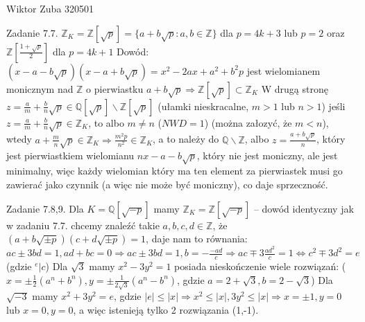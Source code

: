 \documentclass{article}
\begin{document}
Wiktor Zuba 320501
\newline

Zadanie 7.7.
\newline
\newline
$\mathbb{Z}_{K}=\mathbb{Z}[\sqrt{p}]=\{a+b\sqrt{p}:a,b\in\mathbb{Z}\}$ dla $p=4k+3$ lub $p=2$ oraz $\mathbb{Z}[\frac{1+\sqrt{p}}{2}]$ dla $p=4k+1$\newline
Dowód:$(x-a-b\sqrt{p})(x-a+b\sqrt{p})=x^2-2ax+a^2+b^2p$ jest wielomianem monicznym nad $\mathbb{Z}$ o pierwiastku $a+b\sqrt{p}\Rightarrow\mathbb{Z}[\sqrt{p}]\subset\mathbb{Z}_{K}$\newline
W drugą stronę $z=\frac{a}{m}+\frac{b}{n}\sqrt{p}\in\mathbb{Q}[\sqrt{p}]\backslash\mathbb{Z}[\sqrt{p}]$ (ułamki nieskracalne, $m>1$ lub $n>1$)
jeśli $z=\frac{a}{m}+\frac{b}{n}\sqrt{p}\in\mathbb{Z}_{K}$, to albo $m\neq n$ ($NWD=1$) (można załozyć, że $m<n$), wtedy $a+\frac{m}{n}\sqrt{p}\in\mathbb{Z}_{K}\Rightarrow\frac{m^2p}{n^2}\in\mathbb{Z}_{K}$,
a to należy do $\mathbb{Q}\backslash\mathbb{Z}$, albo $z=\frac{a+b\sqrt{p}}{n}$, który jest pierwiastkiem wielomianu $nx-a-b\sqrt{p}$, który nie jest moniczny, ale jest minimalny,
więc każdy wielomian który ma ten element za pierwiastek musi go zawierać jako czynnik (a więc nie może być moniczny), co daje sprzeczność.
\newline

Zadanie 7.8,9.
\newline
\newline
Dla $K=\mathbb{Q}[\sqrt{-p}]$ mamy $\mathbb{Z}_{K}=\mathbb{Z}[\sqrt{-p}]$ -- dowód identyczny jak w zadaniu 7.7.\newline
chcemy znaleźć takie $a,b,c,d\in\mathbb{Z}$, że $(a+b\sqrt{\pm p})(c+d\sqrt{\pm p})=1$, daje nam to równania:\newline
$ac\pm3bd=1,ad+bc=0\Rightarrow ac\pm3bd=1, b=-\frac{-ad}{c}\Rightarrow ac\mp 3\frac{ad^2}{c}=1\Leftrightarrow c^2\mp3d^2=e$ (gdzie $^e|c$)\newline
Dla $\sqrt{3}$ mamy $x^2-3y^2=1$ posiada nieskończenie wiele rozwiązań:\newline
($x=\pm\frac{1}{2}(a^n+b^n), y=\pm\frac{1}{2\sqrt{3}}(a^n-b^n)$, gdzie $a=2+\sqrt{3},b=2-\sqrt{3}$)\newline
Dla $\sqrt{-3}$ mamy $x^2+3y^2=e$, gdzie $|e|\le |x|\Rightarrow x^2\le |x|,3y^2\le |x|\Rightarrow x=\pm1,y=0$ lub $x=0,y=0$, a więc istenieją tylko 2 rozwiązania (1,-1).
\end{document}
